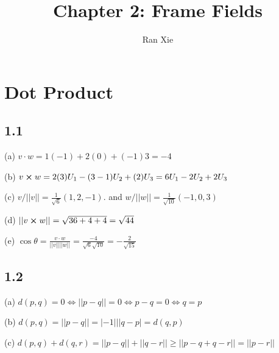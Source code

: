 \documentclass[12pt]{article}
\title{Chapter 2: Frame Fields}
\author{Ran Xie}
\begin{document}
\maketitle
\section{Dot Product}
\subsection*{1.1}
(a) $v \cdot w = 1(-1)+2(0)+(-1)3 = -4$

(b) $v \cross w = 2(3)U_1 - (3- 1)U_2 + (2)U_3 = 6U_1 - 2U_2 + 2U_3$

(c) $v/||v|| = \frac{1}{\sqrt{6}}(1, 2, -1)$.  and $w/||w|| = \frac{1}{\sqrt{10}}(-1, 0, 3)$

(d) $||v \cross w|| = \sqrt{36 + 4 + 4} = \sqrt{44}$

(e) $\cos \theta = \frac{v \cdot w}{||v||||w||} = \frac{-4}{\sqrt{6} \sqrt{10}} = - \frac{2}{\sqrt{15}}$

\subsection*{1.2}
(a) $d(p, q) = 0 \Leftrightarrow ||p-q|| = 0 \Leftrightarrow p - q = 0 \Leftrightarrow q = p$

(b) $d(p, q) = || p - q|| = |-1|||q - p| = d(q, p)$

(c) $d(p, q) + d(q, r) = ||p - q|| + ||q - r|| \geq ||p - q + q - r|| = ||p - r||$
\end{document}

